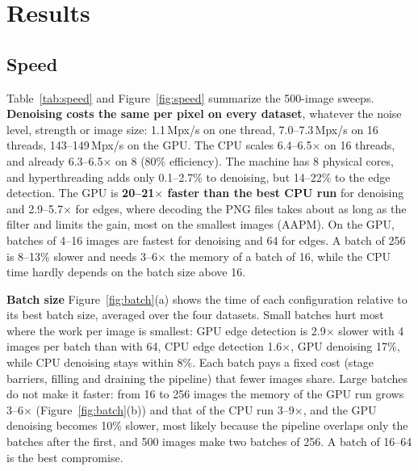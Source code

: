 \documentclass[10pt,a4paper]{article}
\begin{document}
\section{Results}
\subsection{Speed}
Table~\ref{tab:speed} and Figure~\ref{fig:speed} summarize the 500-image sweeps. \textbf{Denoising costs the same per
pixel on every dataset}, whatever the noise level, strength or image size: 1.1\,Mpx/s on one thread, 7.0--7.3\,Mpx/s
on 16 threads, 143--149\,Mpx/s on the GPU. The CPU scales 6.4--6.5$\times$ on 16 threads, and already 6.3--6.5$\times$
on 8 (80\% efficiency). The machine has 8 physical cores, and hyperthreading adds only 0.1--2.7\% to denoising, but
14--22\% to the edge detection. The GPU is \textbf{20--21$\times$ faster than the best CPU run} for denoising and
2.9--5.7$\times$ for edges, where decoding the PNG files takes about as long as the filter and limits the gain, most
on the smallest images (AAPM). On the GPU, batches of 4--16 images are fastest for denoising and 64 for edges. A batch
of 256 is 8--13\% slower and needs 3--6$\times$ the memory of a batch of 16, while the CPU time hardly depends on the
batch size above 16.

\textbf{Batch size} Figure~\ref{fig:batch}(a) shows the time of each configuration relative to its best batch size, averaged over the
four datasets. Small batches hurt most where the work per image is smallest: GPU edge detection is 2.9$\times$ slower with 4 images per batch
than with 64, CPU edge detection 1.6$\times$, GPU denoising 17\%, while CPU denoising stays within 8\%. Each batch pays a fixed cost
(stage barriers, filling and draining the pipeline) that fewer images share. Large batches do not make it faster: from 16 to 256 images
the memory of the GPU run grows 3--6$\times$ (Figure~\ref{fig:batch}(b)) and that of the CPU run 3--9$\times$, and the GPU denoising becomes 10\% slower, most
likely because the pipeline overlaps only the batches after the first, and 500 images make two batches of 256. A batch of 16--64 is the best
compromise.
\end{document}
